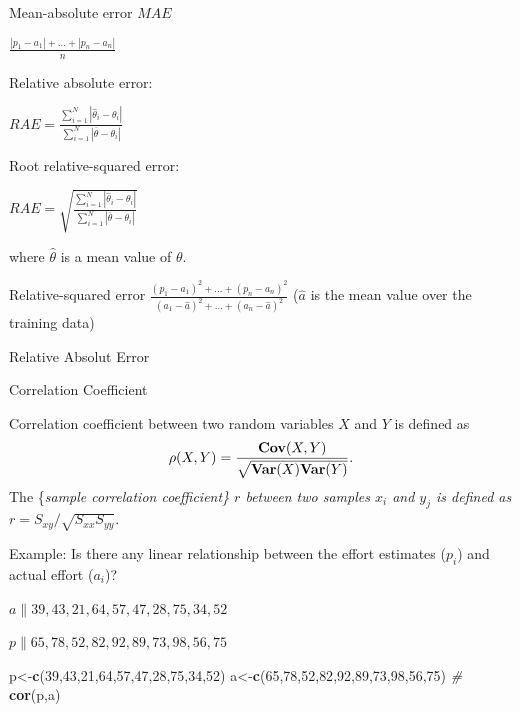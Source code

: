 \documentclass[]{book}
\newenvironment{Shaded}{\begin{snugshade}}{\end{snugshade}}
\newcommand{\KeywordTok}[1]{\textcolor[rgb]{0.13,0.29,0.53}{\textbf{{#1}}}}
\newcommand{\DecValTok}[1]{\textcolor[rgb]{0.00,0.00,0.81}{{#1}}}
\newcommand{\CommentTok}[1]{\textcolor[rgb]{0.56,0.35,0.01}{\textit{{#1}}}}
\newcommand{\NormalTok}[1]{{#1}}
\begin{document}
Mean-absolute error \(MAE\)

\(\frac{|p_1-a_1| + \ldots +|p_n-a_n|}{n}\)

Relative absolute error:

\(RAE = \frac{ \sum^N_{i=1} | \hat{\theta}_i - \theta_i | } { \sum^N_{i=1} | \overline{\theta} - \theta_i | }\)

Root relative-squared error:

\(RAE = \sqrt{ \frac{ \sum^N_{i=1} | \hat{\theta}_i - \theta_i | } { \sum^N_{i=1} | \overline{\theta} - \theta_i | } }\)

where \(\hat{\theta}\) is a mean value of \(\theta\).

Relative-squared error
\(\frac{(p_1-a_1)^2 + \ldots +(p_n-a_n)^2}{(a_1-\hat{a})^2 + \ldots + (a_n-\hat{a})^2}\)
(\(\hat{a}\) is the mean value over the training data)

Relative Absolut Error

Correlation Coefficient

Correlation coefficient between two random variables \(X\) and \(Y\) is
defined as \[\rho(X,Y) = \frac{{\bf
Cov}(X,Y)}{\sqrt{{\bf Var}(X){\bf Var}(Y)}}.\] The \{\em sample
correlation coefficient\} \(r\) between two samples \(x_i\) and \(y_j\)
is defined as \(r = S_{xy}/\sqrt{S_{xx}S_{yy}}.\)

Example: Is there any linear relationship between the effort estimates
(\(p_i\)) and actual effort (\(a_i\))?

\(a\|39,43,21,64,57,47,28,75,34,52\)

\(p\|65,78,52,82,92,89,73,98,56,75\)

\begin{Shaded}
\begin{Highlighting}[]
\NormalTok{p<-}\KeywordTok{c}\NormalTok{(}\DecValTok{39}\NormalTok{,}\DecValTok{43}\NormalTok{,}\DecValTok{21}\NormalTok{,}\DecValTok{64}\NormalTok{,}\DecValTok{57}\NormalTok{,}\DecValTok{47}\NormalTok{,}\DecValTok{28}\NormalTok{,}\DecValTok{75}\NormalTok{,}\DecValTok{34}\NormalTok{,}\DecValTok{52}\NormalTok{)}
\NormalTok{a<-}\KeywordTok{c}\NormalTok{(}\DecValTok{65}\NormalTok{,}\DecValTok{78}\NormalTok{,}\DecValTok{52}\NormalTok{,}\DecValTok{82}\NormalTok{,}\DecValTok{92}\NormalTok{,}\DecValTok{89}\NormalTok{,}\DecValTok{73}\NormalTok{,}\DecValTok{98}\NormalTok{,}\DecValTok{56}\NormalTok{,}\DecValTok{75}\NormalTok{)}
\CommentTok{#}
\KeywordTok{cor}\NormalTok{(p,a)}
\end{Highlighting}
\end{Shaded}
\end{document}
